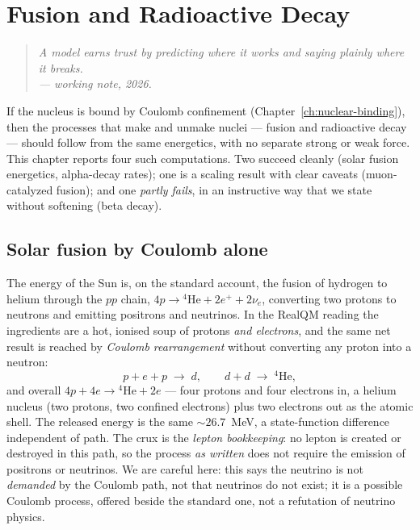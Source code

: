 \chapter{Fusion and Radioactive Decay}\label{ch:nuclear-decay}

\begin{quote}
\itshape A model earns trust by predicting where it works and saying plainly where it breaks.\\
\normalfont\hfill --- working note, 2026.
\end{quote}
\bigskip

If the nucleus is bound by Coulomb confinement (Chapter~\ref{ch:nuclear-binding}), then the processes that make
and unmake nuclei --- fusion and radioactive decay --- should follow from the same energetics, with no separate
strong or weak force. This chapter reports four such computations. Two succeed cleanly (solar fusion energetics,
alpha-decay rates); one is a scaling result with clear caveats (muon-catalyzed fusion); and one \emph{partly
fails}, in an instructive way that we state without softening (beta decay).

\section{Solar fusion by Coulomb alone}\label{sec:solar-fusion}

The energy of the Sun is, on the standard account, the fusion of hydrogen to helium through the $pp$ chain,
$4p\to{}^4\mathrm{He}+2e^+ +2\nu_e$, converting two protons to neutrons and emitting positrons and neutrinos. In
the RealQM reading the ingredients are a hot, ionised soup of protons \emph{and electrons}, and the same net
result is reached by \emph{Coulomb rearrangement} without converting any proton into a neutron:
\[
p+e+p\;\to\;d, \qquad d+d\;\to\;{}^4\mathrm{He},
\]
and overall $4p+4e\to{}^4\mathrm{He}+2e$ --- four protons and four electrons in, a helium nucleus (two protons,
two confined electrons) plus two electrons out as the atomic shell. The released energy is the same
$\sim 26.7$~MeV, a state-function difference independent of path. The crux is the \emph{lepton bookkeeping}: no
lepton is created or destroyed in this path, so the process \emph{as written} does not require the emission of
positrons or neutrinos. We are careful here: this says the neutrino is not \emph{demanded} by the Coulomb path,
not that neutrinos do not exist; it is a possible Coulomb process, offered beside the standard one, not a
refutation of neutrino physics.

